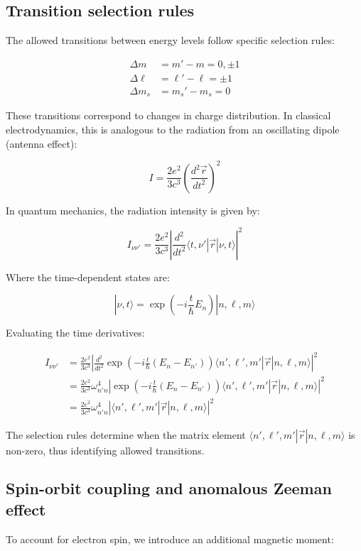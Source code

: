 \documentclass[italian]{HKNdocument}
\begin{document}
\subsection{Transition selection rules}
The allowed transitions between energy levels follow specific selection rules:

\begin{align}
\Delta m &= m'-m=0,\pm 1 \\
\Delta\ell &= \ell'-\ell=\pm 1 \\
\Delta m_s &= m_s'-m_s=0
\end{align}

These transitions correspond to changes in charge distribution. In classical electrodynamics, this is analogous to the radiation from an oscillating dipole (antenna effect):

\begin{equation}
I=\frac{2e^2}{3c^3}\left(\frac{d^2\vec{r}}{dt^2}\right)^2
\end{equation}


In quantum mechanics, the radiation intensity is given by:

\begin{equation}
I_{\nu\nu'}=\frac{2e^2}{3c^3}\left|\frac{d^2}{dt^2}\langle t,\nu'|\vec{r}|\nu,t\rangle\right|^2
\end{equation}

Where the time-dependent states are:

\begin{equation}
|\nu,t\rangle=\exp\left(-i\frac{t}{\hbar}E_n\right)|n,\ell,m\rangle
\end{equation}

Evaluating the time derivatives:

\begin{align}
I_{\nu\nu'} &=\frac{2e^2}{3c^3}\left|\frac{d^2}{dt^2}\exp\left(-i\frac{t}{\hbar}(E_n-E_{n'})\right)\langle n',\ell',m'|\vec{r}|n,\ell,m\rangle\right|^2\\
&=\frac{2e^2}{3c^3}\omega_{n'n}^4\left|\exp\left(-i\frac{t}{\hbar}(E_n-E_{n'})\right)\langle n',\ell',m'|\vec{r}|n,\ell,m\rangle\right|^2 \\
&=\frac{2e^2}{3c^3}\omega_{n'n}^4\left|\langle n',\ell',m'|\vec{r}|n,\ell,m\rangle\right|^2
\end{align}

The selection rules determine when the matrix element $\langle n',\ell',m'|\vec{r}|n,\ell,m\rangle$ is non-zero, thus identifying allowed transitions.

\subsection{Spin-orbit coupling and anomalous Zeeman effect}
To account for electron spin, we introduce an additional magnetic moment:
\end{document}
